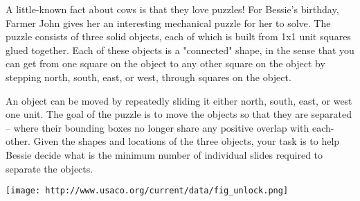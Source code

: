 A little-known fact about cows is that they love puzzles! For Bessie's birthday, Farmer John gives her an interesting mechanical puzzle for her to solve.  The puzzle consists of three solid objects, each of which is built from 1x1 unit squares glued together.  Each of these objects is a "connected" shape,  in the sense that you can get from one square on the object to any other square on the object by stepping north, south, east, or west, through squares on the object.

An object can be moved by repeatedly sliding it either north, south, east, or west one unit.  The goal of the puzzle is to move the objects so that they are separated -- where their bounding boxes no longer share any positive overlap with each-other.  Given the shapes and locations of the three objects, your task is to help Bessie decide what is the minimum number of individual slides required to separate the objects.


\texttt{[image: http://www.usaco.org/current/data/fig\_unlock.png]}